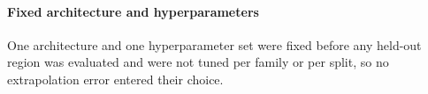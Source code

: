 \paragraph{Fixed architecture and hyperparameters}
One architecture and one hyperparameter set were fixed before any held-out
region was evaluated and were not tuned per family or per split, so no
extrapolation error entered their choice.
